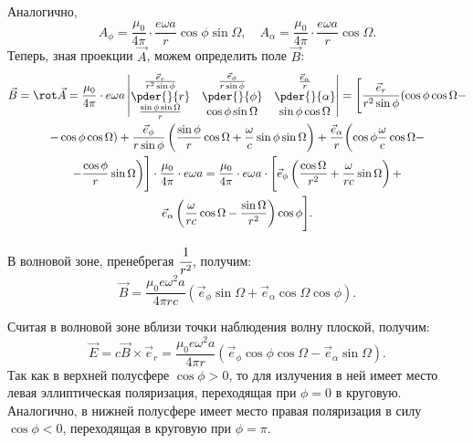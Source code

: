 Аналогично,
\[
    A_\phi = \frac{\mu_0}{4\pi}\cdot\frac{e\omega a}{r}\cos\phi\sin\Omega, \quad
    A_\alpha = \frac{\mu_0}{4\pi}\cdot\frac{e\omega a}{r}\cos\Omega.
\]
Теперь, зная проекции \( \vec{A} \), можем определить поле \( \vec{B} \):
\begin{gather*}
    \vec{B} = \rot\vec{A} = \frac{\mu_0}{4\pi}\cdot e\omega a\begin{vmatrix}
    \frac{\vec{e}_r}{r^2\sin\phi} & \frac{\vec{e}_\phi}{r\sin\phi} &
    \frac{\vec{e}_\alpha}{r} \\ \pder{}{r} & \pder{}{\phi} & \pder{}{\alpha} \\
    \frac{\sin\phi\sin\Omega}{r} & \cos\phi\sin\Omega & \sin\phi\cos\Omega
    \end{vmatrix} = \Biggl[\frac{\vec{e}_r}{r^2\sin\phi}(\cos\phi\cos\Omega - \\
    -\cos\phi\cos\Omega) + \frac{\vec{e}_\phi}{r\sin\phi}\left(\frac{\sin\phi}
    {r}\cos\Omega + \frac{\omega}{c}\sin\phi\sin\Omega\right) +
    \frac{\vec{e}_\alpha}{r}\biggl(\cos\phi\frac{\omega}{c}\cos\Omega - \\
    - \frac{\cos\phi}{r}\sin\Omega\biggr)\Biggr]\cdot\frac{\mu_0}{4\pi}\cdot e
    \omega a = \frac{\mu_0}{4\pi}\cdot e\omega a\cdot\Biggl[\vec{e}_\phi\left(
    \frac{\cos\Omega}{r^2} + \frac{\omega}{rc}\sin\Omega\right) + \\
    \vec{e}_\alpha\left(\frac{\omega}{rc}\cos\Omega - \frac{\sin\Omega}{r^2}
    \right)\cos\phi\Biggr].
\end{gather*}

В волновой зоне, пренебрегая \( \cfrac{1}{r^2} \), получим:
\[
    \vec{B} = \frac{\mu_0e\omega^2a}{4\pi rc}\left(\vec{e}_\phi\sin\Omega +
    \vec{e}_\alpha\cos\Omega\cos\phi\right).
\]

Считая в волновой зоне вблизи точки наблюдения волну плоской, получим:
\[
    \vec{E}=c\vec{B}\times\vec{e}_r = \frac{\mu_0e\omega^2a}{4\pi r}\left(
    \vec{e}_\phi\cos\phi\cos\Omega - \vec{e}_\alpha\sin\Omega\right).
\]
Так как в верхней полусфере \( \cos\phi > 0 \), то для излучения в ней имеет
место левая эллиптическая поляризация, переходящая при \( \phi = 0 \) в
круговую. Аналогично, в нижней полусфере имеет место правая поляризация в силу
\( \cos\phi < 0 \), переходящая в круговую при \( \phi = \pi \).

